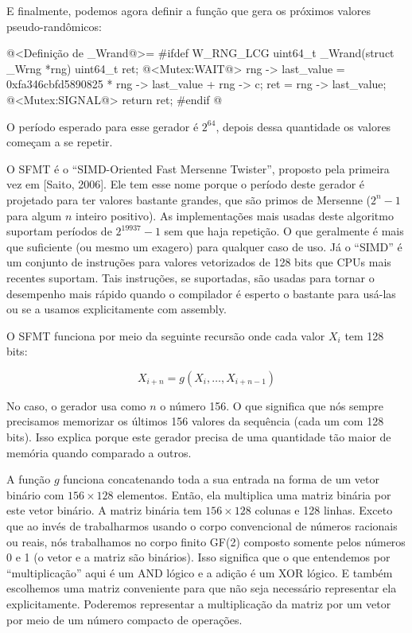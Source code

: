 E finalmente, podemos agora definir a função que gera os próximos
valores pseudo-randômicos:

\iniciocodigo
@<Definição de \_Wrand@>=
#ifdef W_RNG_LCG
uint64_t _Wrand(struct _Wrng *rng){
  uint64_t ret;
  @<Mutex:WAIT@>
  rng -> last_value = 0xfa346cbfd5890825 * rng -> last_value + rng -> c;
  ret = rng -> last_value;
  @<Mutex:SIGNAL@>
  return ret;
}
#endif
@
\fimcodigo

O período esperado para esse gerador é $2^{64}$, depois dessa
quantidade os valores começam a se repetir.



O SFMT é o ``SIMD-Oriented Fast Mersenne Twister'', proposto pela
primeira vez em [Saito, 2006]. Ele tem esse nome porque o período
deste gerador é projetado para ter valores bastante grandes, que são
primos de Mersenne ($2^n-1$ para algum $n$ inteiro positivo). As
implementações mais usadas deste algoritmo suportam períodos de
$2^{19937}-1$ sem que haja repetição. O que geralmente é mais que
suficiente (ou mesmo um exagero) para qualquer caso de uso. Já o
``SIMD'' é um conjunto de instruções para valores vetorizados de 128
bits que CPUs mais recentes suportam. Tais instruções, se suportadas,
são usadas para tornar o desempenho mais rápido quando o compilador é
esperto o bastante para usá-las ou se a usamos explicitamente com
assembly.

O SFMT funciona por meio da seguinte recursão onde cada valor $X_i$
tem 128 bits:

$$
X_{i+n}=g(X_i, \ldots, X_{i+n-1})
$$

No caso, o gerador usa como $n$ o número 156. O que significa que nós
sempre precisamos memorizar os últimos 156 valores da sequência (cada
um com 128 bits). Isso explica porque este gerador precisa de uma
quantidade tão maior de memória quando comparado a outros.

A função $g$ funciona concatenando toda a sua entrada na forma de um
vetor binário com $156 \times 128$ elementos. Então, ela multiplica
uma matriz binária por este vetor binário. A matriz binária tem
$156 \times 128$ colunas e 128 linhas. Exceto que ao invés de
trabalharmos usando o corpo convencional de números racionais ou
reais, nós trabalhamos no corpo finito GF(2) composto somente pelos
números 0 e 1 (o vetor e a matriz são binários). Isso significa que o
que entendemos por ``multiplicação'' aqui é um AND lógico e a adição é
um XOR lógico. E também escolhemos uma matriz conveniente para que não
seja necessário representar ela explicitamente. Poderemos representar
a multiplicação da matriz por um vetor por meio de um número compacto
de operações.


